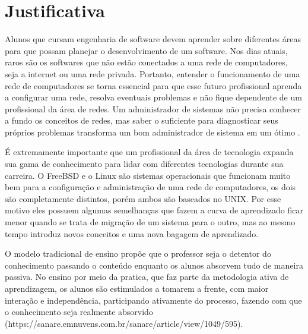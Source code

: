 %


\section{Justificativa}

Alunos que cursam engenharia de software devem aprender sobre diferentes áreas para que possam planejar o desenvolvimento de um software. Nos dias atuais, raros são os softwares que não estão conectados a uma rede de computadores, seja a internet ou uma rede privada. Portanto, entender o funcionamento de uma rede de computadores se torna essencial para que esse futuro profissional aprenda a configurar uma rede, resolva eventuais problemas e não fique dependente de um profissional da área de redes. Um administrador de sistemas não precisa conhecer a fundo os conceitos de redes, mas saber o suficiente para diagnosticar seus próprios problemas transforma um bom administrador de sistema em um ótimo \cite{Lucas2019}.

É extremamente importante que um profissional da área de tecnologia expanda sua gama de conhecimento para lidar com diferentes tecnologias durante sua carreira. O FreeBSD e o Linux são sistemas operacionais que funcionam muito bem para a configuração e administração de uma rede de computadores, os dois são completamente distintos, porém ambos são baseados no UNIX. Por esse motivo eles possuem algumas semelhanças que fazem a curva de aprendizado ficar menor quando se trata de migração de um sistema para o outro, mas ao mesmo tempo introduz novos conceitos e uma nova bagagem de aprendizado.

O modelo tradicional de ensino propõe que o professor seja o detentor do conhecimento passando o conteúdo enquanto os alunos absorvem tudo de maneira passiva. No ensino por meio da pratica, que faz parte da metodologia ativa de aprendizagem, os alunos são estimulados a tomarem a frente, com maior interação e independência, participando ativamente do processo, fazendo com que o conhecimento seja realmente absorvido (https://sanare.emnuvens.com.br/sanare/article/view/1049/595). %

